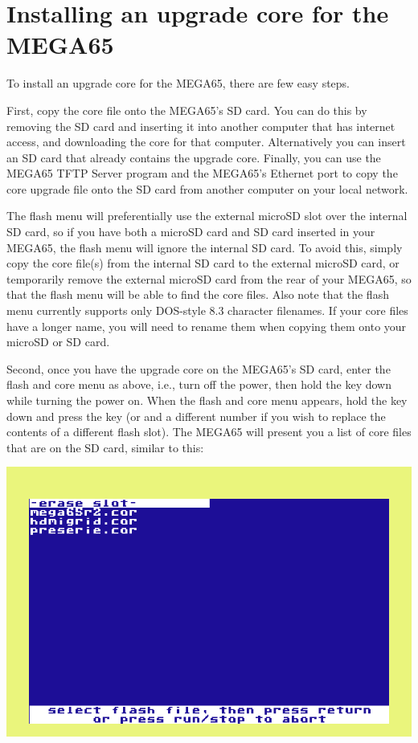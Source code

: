\section{Installing an upgrade core for the MEGA65}

To install an upgrade core for the MEGA65, there are few easy steps.

First, copy the core file onto the MEGA65's SD card.  You can do this by removing the SD card and inserting
it into another computer that has internet access, and downloading the core for that computer. Alternatively
you can insert an SD card that already contains the upgrade core. Finally, you can use the MEGA65 TFTP Server
program and the MEGA65's Ethernet port to copy the core upgrade file onto the SD card from another computer
on your local network.

The flash menu will preferentially use the external microSD slot over
the internal SD card, so if you have both a microSD card and SD card
inserted in your MEGA65, the flash menu will ignore the
internal SD card. To avoid this, simply copy the core file(s) from the internal SD
card to the external microSD card, or temporarily remove the external
microSD card from the rear of your MEGA65, so that the flash menu will
be able to find the core files.  Also note that the flash menu
currently supports only DOS-style 8.3 character filenames. If your
core files have a longer name, you will need to rename them when
copying them onto your microSD or SD card.

Second, once you have the upgrade core on the MEGA65's SD card, enter the flash and core menu as above,
i.e., turn off the power, then hold the  key down while turning the power on.  When the flash
and core menu appears, hold the  key down and press the
 key (or  and a different number if you wish to replace the
contents of a different flash slot).  The MEGA65
will present you a list of core files that are on the SD card, similar
to this:

\includegraphics[width=\linewidth]{images/ss-flashmenu-selectcore.png}

